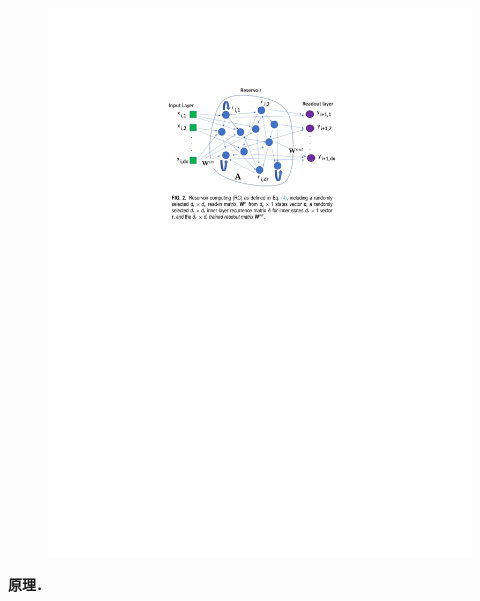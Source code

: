 \begin{figure}[h]
    \includegraphics[width=\textwidth]{images/bollt.reservoir.pdf}
    \caption{}
\end{figure}  


\textbf{原理．}

